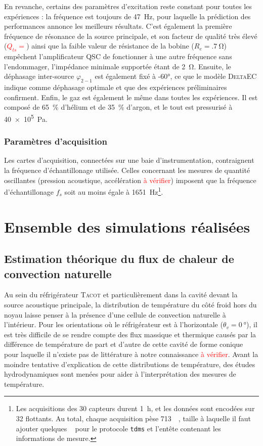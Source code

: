 En revanche, certains des paramètres d'excitation reste constant pour toutes les expériences : la fréquence est toujours de \qty{47}{\hertz}, pour laquelle la prédiction des performances annonce les meilleurs résultats. C'est également la première fréquence de résonance de la source principale, et son facteur de qualité très élevé (\textcolor{red}{$Q_{ts}=$}) ainsi que la faible valeur de résistance de la bobine ($R_e=\qty{.7}{\ohm}$) empêchent l'amplificateur QSC de fonctionner à une autre fréquence sans l'endommager, l'impédance minimale supportée étant de \qty{2}{\ohm}. Ensuite, le déphasage inter-source $\varphi_{2-1}$ est également fixé à \ang{-60}, ce que le modèle \textsc{DeltaEC} indique comme déphasage optimale et que des expériences préliminaires confirment. Enfin, le gaz est également le même dans toutes les expériences. Il est composé de \qty{65}{\percent} d'hélium et de \qty{35}{\percent} d'argon, et le tout est pressurisé à \qty{40e5}{\pascal}.



\subsubsection{Paramètres d'acquisition}

Les cartes d'acquisition, connectées sur une baie d'instrumentation, contraignent la fréquence d'échantillonage utilisée. Celles concernant les mesures de quantité oscillantes (pression acoustique, accélération \textcolor{red}{à vérifier}) imposent que la fréquence d'échantillonage $f_s$ soit au moins égale à \qty{1651}{\Hz}\footnote{Les acquisitions des \num{30} capteurs durent \qty{1}{\hour}, et les données sont encodées sur \qty{32}{\bit} flottants. Au total, chaque acquisition pèse \qty{713}{\mega\byte}, taille à laquelle il faut ajouter quelques \unit{\mega\byte} pour le protocole \texttt{tdms} et l'entête contenant les informations de mesure.}.

\section{Ensemble des simulations réalisées}
\subsection{Estimation théorique du flux de chaleur de convection naturelle}
Au sein du réfrigérateur \textsc{Tacot} et particulièrement dans la cavité devant la source acoustique principale, la distribution de température du côté froid hors du noyau laisse penser à la présence d'une cellule de convection naturelle à l'intérieur. Pour les orientations où le réfrigérateur est à l'horizontale ($\theta_v=\qty{0}{\degree}$), il est très difficile de se rendre compte des flux massique et thermique causés par la différence de température de part et d'autre de cette cavité de forme conique pour laquelle il n'existe pas de littérature à notre connaissance \textcolor{red}{à vérifier}. Avant la moindre tentative d'explication de cette distributions de température, des études hydrodynamiques sont menées pour aider à l'interprétation des mesures de température. 

